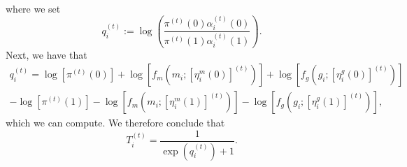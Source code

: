 \documentclass[12pt]{article}
\begin{document}
\begin{appendices}
\begin{refsection}
\begin{multline}
		\end{multline}
		where we set 
		\begin{equation}\label{e_step_2}
		q_i^{(t)} := \log\left(\frac{\pi^{(t)}(0) \alpha_i^{(t)}(0)}{\pi^{(t)}(1) \alpha_i^{(t)}(1)}\right).
		\end{equation}
		Next, we have that
		\begin{multline*}
		q^{(t)}_i = \log\left[ \pi^{(t)}(0) \right] + \log\left[ f_m\left(m_i; \left[ \eta^m_i(0) \right]^{(t)}\right) \right] + \log\left[ f_g\left(g_i; \left[ \eta^g_i(0) \right]^{(t)}\right) \right] \\ - \log\left[ \pi^{(t)}(1) \right] - \log\left[ f_m\left(m_i; \left[ \eta^m_i(1) \right]^{(t)}\right) \right] - \log\left[ f_g\left(g_i; \left[ \eta^g_i(1) \right]^{(t)}\right) \right],
		\end{multline*}
		which we can compute. We therefore conclude that
		$$ T_i^{(t)} = \frac{1}{\exp\left(q^{(t)}_i\right) + 1}.$$

\end{refsection}
\end{appendices}
\end{document}
